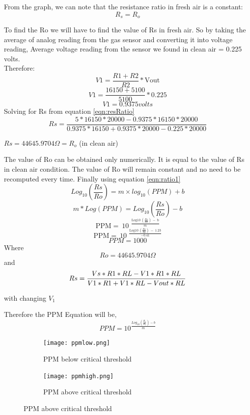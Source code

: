 				From the graph, we can note that the resistance ratio in fresh air is a constant: \\
				\[R_s = R_o\]
				\par To find the Ro we will have to find the value of Rs in fresh air. So by taking the average of analog reading from the gas sensor and converting it into voltage reading, Average voltage reading from the sensor we found in clean air = 0.225 volts. \\
				Therefore: \\
				\[V1= \frac{R\mathrm{1+}R\mathrm{2}}{R\mathrm{2}}*\mathrm{Vout}\]
				\[V1= \frac{\mathrm{16150+5100}}{\mathrm{5100}}*0.225\]
				\[V1= 0.9375 volts\]
				Solving for Rs from equation \ref{eqn:resRatio} \\
				\[Rs=\frac{5*16150*20000-0.9375*16150*20000}{0.9375*16150+0.9375*20000-0.225*20000}\] 
				\begin{center}
				$Rs = 44645.9704\Omega = R_o $ (in clean air)
				\end{center}
				\par The value of Ro can be obtained only numerically. It is equal to the value of Rs in clean air condition. The value of Ro will remain constant and no need to be recomputed every time.
				Finally using equation \ref{eqn:ratio1} \\
				\[Log_10(\frac{Rs}{Ro}) = m\times log_10(PPM) + b\]
				\[m * Log(PPM) = Log_10(\frac{Rs}{Ro}) - b\] 
				\[\mathrm{PPM=\ }{\mathrm{10}}^{\ \ \frac{\mathrm{Log}\mathrm{10\ }\left(\frac{Rs}{Ro}\right)\mathrm{\ -\ b}}{m}}\] 		
				\[\mathrm{PPM=\ }{\mathrm{10}}^{\ \ \frac{\mathrm{Log}\mathrm{10\ }\left(\frac{Rs}{Ro}\right)\mathrm{\ -\ 1.23}}{-0.41}}\] 
				\[PPM=1000\]
				Where \\
				\[Ro=44645.9704\Omega  \]
				and \\
				
				\[\small Rs=\frac{Vs*R1*RL-V1*R1*RL}{V1*R1+V1*RL-Vout*RL}\] 
				
				\begin{center}
				 with changing $V_1$ \\
				\end{center}
				Therefore the PPM Equation will be,\\
				\[PPM = 10^\frac{Log_10(\frac{R_s}{R_o})-b}{m}\]
				
				\begin{figure}[h]
					\centering
				\begin{subfigure}[t]{0.5\linewidth}
						\texttt{[image: ppmlow.png]}
						\caption{PPM below critical threshold}
				\end{subfigure}
				\begin{subfigure}[t]{0.5\linewidth}
					\texttt{[image: ppmhigh.png]}
					\caption{PPM above critical threshold}
				\end{subfigure}
				\end{figure}
			
				
		
	